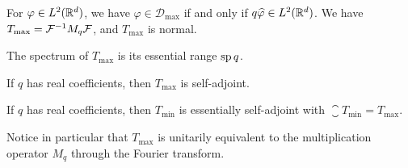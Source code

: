 \documentclass[article, a4paper, 11pt, oneside]{memoir}
\let\phi\varphi
\numberwithin{equation}{chapter}
\newcommand{\dom}{\mathcal{D}}
\theoremstyle{myexample}
\theoremstyle{myexample}
\theoremstyle{myexamplebreak}
\theoremstyle{myexamplebreak}
\theoremstyle{nonumberplain}
\theoremstyle{MyNonumberplain}
\begin{document}
\begin{theorem}
    \label{thm:differential_operator}
    
    \begin{enumthm}
        \item \label{enum:Tmax_conjugate} For $\phi \in L^2(\setR^d)$, we have $\phi \in \dom_{\max}$ if and only if $q \widehat\phi \in L^2(\setR^d)$. We have $T_{\max} = \mathcal{F}^{-1} M_q \mathcal{F}$, and $T_{\max}$ is normal.
        
        \item \label{enum:Tmax_spectrum} The spectrum of $T_{\max}$ is its essential range $\operatorname{sp} q$.
        
        \item \label{enum:Tmax_selfadjoint} If $q$ has real coefficients, then $T_{\max}$ is self-adjoint.
        
        \item \label{enum:Tmin_ess_selfadjoint} If $q$ has real coefficients, then $T_{\min}$ is essentially self-adjoint with $\closure T_{\!\!\min} = T_{\max}$.
    \end{enumthm}
\end{theorem} 
%
Notice in particular that $T_{\max}$ is unitarily equivalent to the multiplication operator $M_q$ through the Fourier transform.
\end{document}
